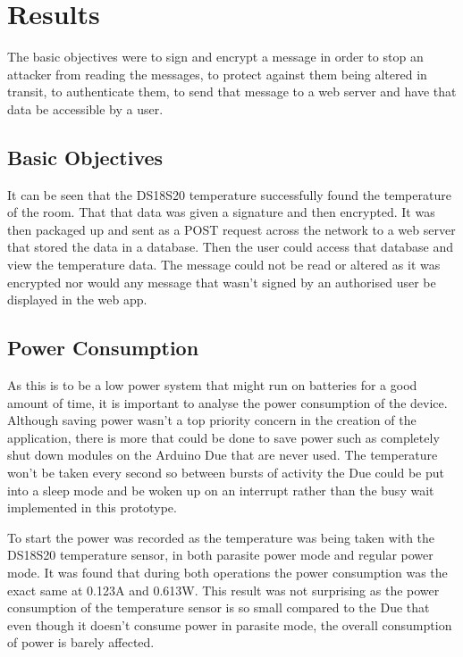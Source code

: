 \chapter{Results}
\label{res}

The basic objectives were to sign and encrypt a message in order to stop an attacker from reading the messages, to protect against them being altered in transit, to authenticate them, to send that message to a web server and have that data be accessible by a user.

\section{Basic Objectives}

It can be seen that the DS18S20 temperature successfully found the temperature of the room. That that data was given a signature and then encrypted. It was then packaged up and sent as a POST request across the network to a web server that stored the data in a database. Then the user could access that database and view the temperature data. The message could not be read or altered as it was encrypted nor would any message that wasn't signed by an authorised user be displayed in the web app.

\section{Power Consumption}

As this is to be a low power system that might run on batteries for a good amount of time, it is important to analyse the power consumption of the device. Although saving power wasn't a top priority concern in the creation of the application, there is more that could be done to save power such as completely shut down modules on the Arduino Due that are never used. The temperature won't be taken every second so between bursts of activity the Due could be put into a sleep mode and be woken up on an interrupt rather than the busy wait implemented in this prototype.

To start the power was recorded as the temperature was being taken with the DS18S20 temperature sensor, in both parasite power mode and regular power mode. It was found that during both operations the power consumption was the exact same at 0.123A and 0.613W. This result was not surprising as the power consumption of the temperature sensor is so small compared to the Due that even though it doesn't consume power in parasite mode, the overall consumption of power is barely affected.

